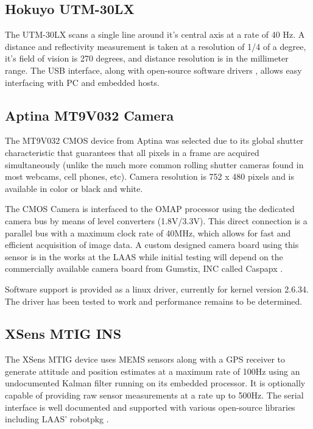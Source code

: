 \documentclass[a4paper,11pt]{report}
\begin{document}
\subsection{Hokuyo UTM-30LX}
\label{Hokuyo}

The UTM-30LX scans a single line around it's central axis at a rate of 40 Hz. A distance and reflectivity measurement is taken at a resolution of 1/4 of a degree, it's field of vision is 270 degrees, and distance resolution is in the millimeter range. The USB interface, along with open-source software drivers \cite{robotpkg}, allows easy interfacing with PC and embedded hosts.

\subsection{Aptina MT9V032 Camera}
\label{caspa}

The MT9V032 CMOS device from Aptina was selected due to its global shutter characteristic that guarantees that all pixels in a frame are acquired simultaneously (unlike the much more common rolling shutter cameras found in most webcams, cell phones, etc). Camera resolution is 752 x 480 pixels and is available in color or black and white. 

The CMOS Camera is interfaced to the OMAP processor using the dedicated camera bus by means of level converters (1.8V/3.3V). This direct connection is a parallel bus with a maximum clock rate of 40MHz, which allows for fast and efficient acquisition of image data. A custom designed camera board using this sensor is in the works at the LAAS while initial testing will depend on the commercially available camera board from Gumstix, INC called Caspapx \cite{caspa}.

Software support is provided as a linux driver, currently for kernel version 2.6.34. The driver has been tested to work and performance remains to be determined.

\subsection{XSens MTIG INS}
\label{MTIG}

The XSens MTIG device uses MEMS sensors along with a GPS receiver to generate attitude and position estimates at a maximum rate of 100Hz using an undocumented Kalman filter running on its embedded processor. It is optionally capable of providing raw sensor measurements at a rate up to 500Hz. The serial interface is well documented and supported with various open-source libraries including LAAS' robotpkg \cite{robotpkg}.
\end{document}
